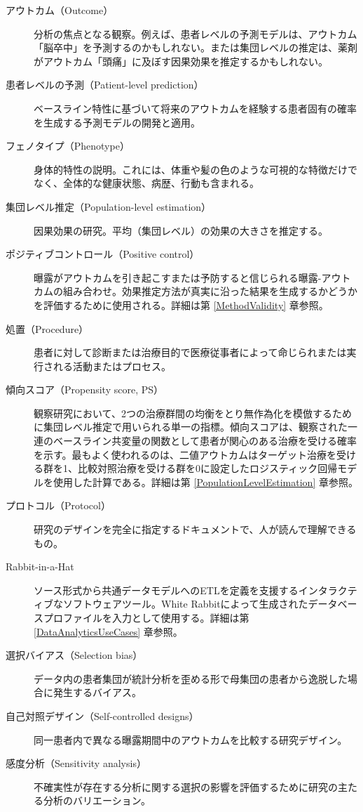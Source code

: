\documentclass[
  11pt]{book}
\theoremstyle{definition}
\theoremstyle{definition}
\theoremstyle{definition}
\theoremstyle{definition}
\theoremstyle{remark}
\begin{document}
\begin{description}
\item[アウトカム（Outcome）]
分析の焦点となる観察。例えば、患者レベルの予測モデルは、アウトカム「脳卒中」を予測するのかもしれない。または集団レベルの推定は、薬剤がアウトカム「頭痛」に及ぼす因果効果を推定するかもしれない。
\item[患者レベルの予測（Patient-level prediction）]
ベースライン特性に基づいて将来のアウトカムを経験する患者固有の確率を生成する予測モデルの開発と適用。
\item[フェノタイプ（Phenotype）]
身体的特性の説明。これには、体重や髪の色のような可視的な特徴だけでなく、全体的な健康状態、病歴、行動も含まれる。
\item[集団レベル推定（Population-level estimation）]
因果効果の研究。平均（集団レベル）の効果の大きさを推定する。
\item[ポジティブコントロール（Positive control）]
曝露がアウトカムを引き起こすまたは予防すると信じられる曝露-アウトカムの組み合わせ。効果推定方法が真実に沿った結果を生成するかどうかを評価するために使用される。詳細は第 \ref{MethodValidity} 章参照。
\item[処置（Procedure）]
患者に対して診断または治療目的で医療従事者によって命じられまたは実行される活動またはプロセス。
\item[傾向スコア（Propensity score, PS）]
観察研究において、2つの治療群間の均衡をとり無作為化を模倣するために集団レベル推定で用いられる単一の指標。傾向スコアは、観察された一連のベースライン共変量の関数として患者が関心のある治療を受ける確率を示す。最もよく使われるのは、二値アウトカムはターゲット治療を受ける群を1、比較対照治療を受ける群を0に設定したロジスティック回帰モデルを使用した計算である。詳細は第 \ref{PopulationLevelEstimation} 章参照。
\item[プロトコル（Protocol）]
研究のデザインを完全に指定するドキュメントで、人が読んで理解できるもの。
\item[Rabbit-in-a-Hat]
ソース形式から共通データモデルへのETLを定義を支援するインタラクティブなソフトウェアツール。White Rabbitによって生成されたデータベースプロファイルを入力として使用する。詳細は第 \ref{DataAnalyticsUseCases} 章参照。
\item[選択バイアス（Selection bias）]
データ内の患者集団が統計分析を歪める形で母集団の患者から逸脱した場合に発生するバイアス。
\item[自己対照デザイン（Self-controlled designs）]
同一患者内で異なる曝露期間中のアウトカムを比較する研究デザイン。
\item[感度分析（Sensitivity analysis）]
不確実性が存在する分析に関する選択の影響を評価するために研究の主たる分析のバリエーション。

\end{description}
\end{document}
